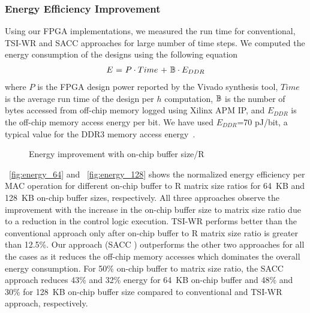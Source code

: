{{{{\subsubsection{Energy Efficiency Improvement}
Using our FPGA implementations, we measured the run time for conventional, TSI-WR and SACC approaches for large number of time steps. We computed the energy consumption of the designs using the following equation~\cite{tu2017deep}
\begin{align}\label{eq:energyEfficiency}
	E~{=}~P\cdot Time~{+}~\mathbb{B}\cdot E_{DDR}
\end{align}
where $P$ is the FPGA design power reported by the Vivado synthesis tool, $Time$ is the average run time of the design per $h$ computation, $\mathbb{B}$ is the number of bytes accessed from off-chip memory logged using Xilinx APM IP, and $E_{DDR}$ is the off-chip memory access energy per bit. We have used $E_{DDR}$=70 pJ/bit, a typical value for the DDR3 memory access energy~\cite{6237004}.
\begin{figure}[htb!]
	\centering
	\hspace{2.0em}
	\caption{Energy improvement with on-chip buffer size/R}\label{fig:energyVsMem}
\end{figure}
\figurename{~\ref{fig:energy_64}} and \figurename{~\ref{fig:energy_128}} shows the normalized energy efficiency per MAC operation for different on-chip buffer to R matrix size ratios for 64~KB and 128~KB on-chip buffer sizes, respectively.  All three approaches observe the improvement with the increase in the on-chip buffer size to matrix size ratio due to a reduction in the control logic execution. TSI-WR performs better than the conventional approach only after on-chip buffer to R matrix size ratio is greater than 12.5\%. Our approach (SACC ) outperforms the other two approaches for all the cases as it reduces the off-chip memory accesses which dominates the overall energy consumption. For 50\% on-chip buffer to matrix size ratio, the SACC approach reduces 43\% and 32\% energy for 64~KB on-chip buffer and 48\% and 30\% for 128~KB on-chip buffer size compared to conventional and TSI-WR approach, respectively.

}}}}
